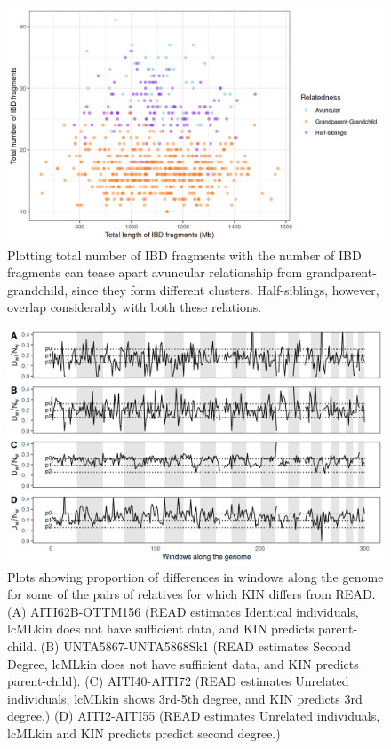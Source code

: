 \documentclass[12pt, letterpaper]{article}
\begin{document}
\begin{figure}[h!]
    \centering
    \includegraphics[width=18cm]{supplementary_info/plots/degree2_10Mwin.png}
    \caption{Plotting total number of IBD fragments with the number of IBD fragments can tease apart avuncular relationship from grandparent-grandchild, since they form different clusters. Half-siblings, however, overlap considerably with both these relations.}
    \label{figS7:second_degree}
\end{figure}


\begin{figure}[!ht]
    \centering
    \includegraphics[width=18cm]{supplementary_info/plots/egplot1.png}
    \caption{Plots showing proportion of differences in windows along the genome for some of the pairs of relatives for which KIN differs from READ. (A) AITI62B-OTTM156 (READ estimates Identical individuals, lcMLkin does not have sufficient data, and KIN predicts parent-child. (B) UNTA5867-UNTA5868Sk1 (READ estimates Second Degree, lcMLkin does not have sufficient data, and KIN predicts parent-child). (C) AITI40-AITI72 (READ estimates Unrelated individuals, lcMLkin shows 3rd-5th degree, and KIN predicts 3rd degree.)
    (D) AITI2-AITI55 (READ estimates Unrelated individuals, lcMLkin and KIN predicts predict second degree.)}
    \label{figS8:eg1}
\end{figure}
\end{document}
